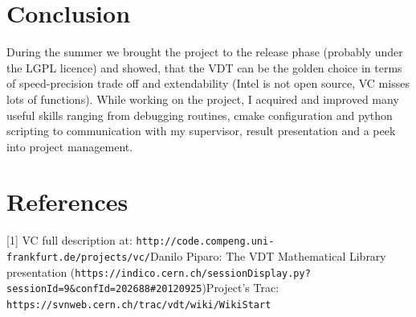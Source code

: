 \documentclass[oneside,10pt,a4paper]{article}
\begin{document}
\section{Conclusion}
During the summer we brought the project to the release phase (probably under the LGPL licence) and showed, that the VDT can be the golden choice in terms of speed-precision trade off and extendability (Intel is not open source, VC misses lots of functions). While working on the project, I acquired and improved many useful skills ranging from debugging routines, cmake configuration and python scripting to communication with my supervisor, result presentation and a peek into project management.

\section{References}

[1] VC full description at: {\tt http://code.compeng.uni-frankfurt.de/projects/vc/}\newline
[2] Danilo Piparo: The VDT Mathematical Library presentation \newline
({\tt https://indico.cern.ch/sessionDisplay.py?sessionId=9\&confId=202688\#20120925})\newline
[3] Project's Trac: {\tt https://svnweb.cern.ch/trac/vdt/wiki/WikiStart}
\end{document}
